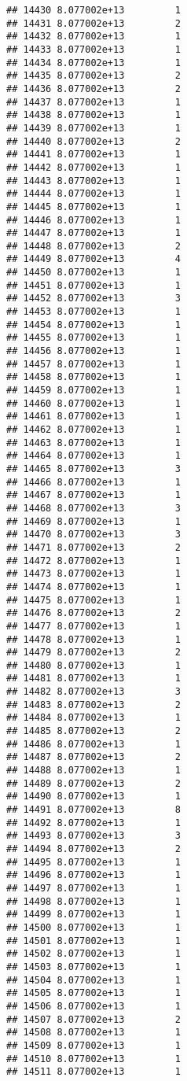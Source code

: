 \documentclass[
]{article}
\begin{document}
\begin{verbatim}
## 14430 8.077002e+13         1
## 14431 8.077002e+13         2
## 14432 8.077002e+13         1
## 14433 8.077002e+13         1
## 14434 8.077002e+13         1
## 14435 8.077002e+13         2
## 14436 8.077002e+13         2
## 14437 8.077002e+13         1
## 14438 8.077002e+13         1
## 14439 8.077002e+13         1
## 14440 8.077002e+13         2
## 14441 8.077002e+13         1
## 14442 8.077002e+13         1
## 14443 8.077002e+13         1
## 14444 8.077002e+13         1
## 14445 8.077002e+13         1
## 14446 8.077002e+13         1
## 14447 8.077002e+13         1
## 14448 8.077002e+13         2
## 14449 8.077002e+13         4
## 14450 8.077002e+13         1
## 14451 8.077002e+13         1
## 14452 8.077002e+13         3
## 14453 8.077002e+13         1
## 14454 8.077002e+13         1
## 14455 8.077002e+13         1
## 14456 8.077002e+13         1
## 14457 8.077002e+13         1
## 14458 8.077002e+13         1
## 14459 8.077002e+13         1
## 14460 8.077002e+13         1
## 14461 8.077002e+13         1
## 14462 8.077002e+13         1
## 14463 8.077002e+13         1
## 14464 8.077002e+13         1
## 14465 8.077002e+13         3
## 14466 8.077002e+13         1
## 14467 8.077002e+13         1
## 14468 8.077002e+13         3
## 14469 8.077002e+13         1
## 14470 8.077002e+13         3
## 14471 8.077002e+13         2
## 14472 8.077002e+13         1
## 14473 8.077002e+13         1
## 14474 8.077002e+13         1
## 14475 8.077002e+13         1
## 14476 8.077002e+13         2
## 14477 8.077002e+13         1
## 14478 8.077002e+13         1
## 14479 8.077002e+13         2
## 14480 8.077002e+13         1
## 14481 8.077002e+13         1
## 14482 8.077002e+13         3
## 14483 8.077002e+13         2
## 14484 8.077002e+13         1
## 14485 8.077002e+13         2
## 14486 8.077002e+13         1
## 14487 8.077002e+13         2
## 14488 8.077002e+13         1
## 14489 8.077002e+13         2
## 14490 8.077002e+13         1
## 14491 8.077002e+13         8
## 14492 8.077002e+13         1
## 14493 8.077002e+13         3
## 14494 8.077002e+13         2
## 14495 8.077002e+13         1
## 14496 8.077002e+13         1
## 14497 8.077002e+13         1
## 14498 8.077002e+13         1
## 14499 8.077002e+13         1
## 14500 8.077002e+13         1
## 14501 8.077002e+13         1
## 14502 8.077002e+13         1
## 14503 8.077002e+13         1
## 14504 8.077002e+13         1
## 14505 8.077002e+13         1
## 14506 8.077002e+13         1
## 14507 8.077002e+13         2
## 14508 8.077002e+13         1
## 14509 8.077002e+13         1
## 14510 8.077002e+13         1
## 14511 8.077002e+13         1

\end{verbatim}
\end{document}
